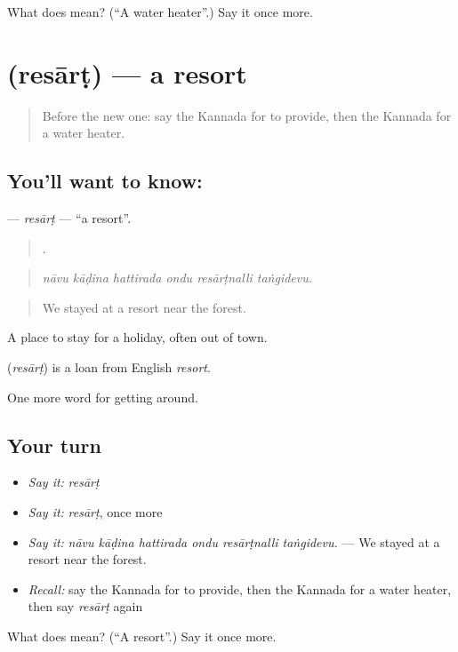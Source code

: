 \begin{tcolorbox}[breakable,colback=teal!4,colframe=teal!35!black,title={Before you move on}]
What does  mean? (\textquotedblleft{}A water heater\textquotedblright{}.) Say it once more.
\end{tcolorbox}
\section[\texorpdfstring{\kn{ರೆಸಾರ್ಟ್} (resārṭ)}{ರೆಸಾರ್ಟ್ (resārṭ)}]{ (resārṭ) — a resort}

\label{lesson:KA-C463-resart}



\begin{quote}
Before the new one: say the Kannada for to provide, then the Kannada for a water heater.
\end{quote}

\subsection*{You'll want to know: }
\textbf{} — \emph{resārṭ} — \textquotedblleft{}a resort\textquotedblright{}.

\begin{quote}
     .
\end{quote}

\begin{quote}
\emph{nāvu kāḍina hattirada ondu resārṭnalli taṅgidevu.}
\end{quote}

\begin{quote}
We stayed at a resort near the forest.
\end{quote}

A place to stay for a holiday, often out of town.

\begin{cousinweb}
\textbf{} (\emph{resārṭ}) is a loan from English \emph{resort}.
\end{cousinweb}

\begin{grammarlens}[title={What you've built}]
One more word for getting around.
\end{grammarlens}

\subsection*{Your turn}
\begin{itemize}
\raggedright
  \item \emph{Say it:} \emph{resārṭ}
  \item \emph{Say it:} \emph{resārṭ}, once more
  \item \emph{Say it:} \emph{nāvu kāḍina hattirada ondu resārṭnalli taṅgidevu.} — We stayed at a resort near the forest.
  \item \emph{Recall:} say the Kannada for to provide, then the Kannada for a water heater, then say \emph{resārṭ} again
\end{itemize}

\begin{tcolorbox}[breakable,colback=teal!4,colframe=teal!35!black,title={Before you move on}]
What does  mean? (\textquotedblleft{}A resort\textquotedblright{}.) Say it once more.
\end{tcolorbox}
